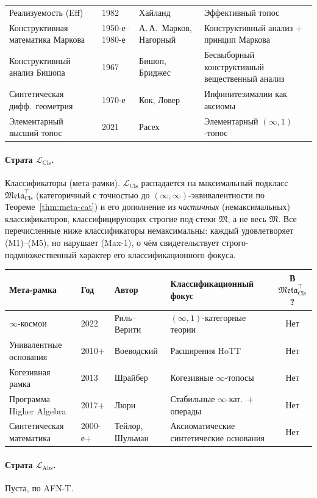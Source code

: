 \documentclass[11pt]{article}
\theoremstyle{plain}
\theoremstyle{definition}
\newcommand{\fM}{\mathfrak{M}}
\newcommand{\Meta}{\mathfrak{Meta}}
\newcommand{\LCls}{\mathcal{L}_{\mathrm{Cls}}}
\newcommand{\LAbs}{\mathcal{L}_{\mathrm{Abs}}}
\begin{document}
\begin{longtable}{@{}p{3.8cm}l p{4cm} p{4.6cm}@{}}
Реализуемость (Eff) & 1982 & Хайланд & Эффективный топос \\
Конструктивная математика Маркова & 1950-е--1980-е & А.\,А.~Марков, Нагорный & Конструктивный анализ + принцип Маркова \\
Конструктивный анализ Бишопа & 1967 & Бишоп, Бриджес & Бесвыборный конструктивный вещественный анализ \\
Синтетическая дифф.~геометрия & 1970-е & Кок, Ловер & Инфинитезималии как аксиомы \\
Элементарный высший топос & 2021 & Расех & Элементарный $(\infty, 1)$-топос \\
\bottomrule
\end{longtable}

\paragraph{Страта $\LCls$.} Классификаторы (мета-рамки). $\LCls$ распадается на максимальный подкласс $\Meta_{\mathrm{Cls}}^{\top}$ (категоричный с точностью до $(\infty, \infty)$-эквивалентности по Теореме~\ref{thm:meta-cat}) и его дополнение из \emph{частичных} (немаксимальных) классификаторов, классифицирующих строгие под-стеки $\fM$, а не весь $\fM$. Все перечисленные ниже классификаторы немаксимальны: каждый удовлетворяет (M1)--(M5), но нарушает (Max-1), о чём свидетельствует строго-подмножественный характер его классификационного фокуса.

\begin{longtable}{@{}p{3.3cm}l p{3cm} p{4.4cm}c@{}}
\toprule
Мета-рамка & Год & Автор & Классификационный фокус & В $\Meta_{\mathrm{Cls}}^{\top}$? \\ \midrule
$\infty$-космои & 2022 & Риль--Верити & $(\infty, 1)$-категорные теории & Нет \\
Унивалентные основания & 2010+ & Воеводский & Расширения HoTT & Нет \\
Когезивная рамка & 2013 & Шрайбер & Когезивные $\infty$-топосы & Нет \\
Программа Higher Algebra & 2017+ & Люри & Стабильные $\infty$-кат.\ + операды & Нет \\
Синтетическая математика & 2000-е+ & Тейлор, Шульман & Аксиоматические синтетические основания & Нет \\
\bottomrule
\end{longtable}

\paragraph{Страта $\LAbs$.} Пуста, по AFN-T.
\end{document}
